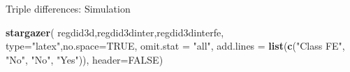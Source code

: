 \documentclass[
  ignorenonframetext,
]{beamer}
\newenvironment{Shaded}{\begin{snugshade}}{\end{snugshade}}
\newcommand{\DataTypeTok}[1]{\textcolor[rgb]{0.13,0.29,0.53}{#1}}
\newcommand{\KeywordTok}[1]{\textcolor[rgb]{0.13,0.29,0.53}{\textbf{#1}}}
\newcommand{\NormalTok}[1]{#1}
\newcommand{\OtherTok}[1]{\textcolor[rgb]{0.56,0.35,0.01}{#1}}
\newcommand{\StringTok}[1]{\textcolor[rgb]{0.31,0.60,0.02}{#1}}
\begin{document}
\begin{frame}[fragile]{Triple differences: Simulation}
\protect\hypertarget{triple-differences-simulation-3}{}
\tiny

\begin{Shaded}
\begin{Highlighting}[]
\KeywordTok{stargazer}\NormalTok{( regdid3d,regdid3dinter,regdid3dinterfe,}
           \DataTypeTok{type=}\StringTok{"latex"}\NormalTok{,}\DataTypeTok{no.space=}\OtherTok{TRUE}\NormalTok{,  }\DataTypeTok{omit.stat =} \StringTok{"all"}\NormalTok{,}
           \DataTypeTok{add.lines =} \KeywordTok{list}\NormalTok{(}\KeywordTok{c}\NormalTok{(}\StringTok{"Class FE"}\NormalTok{, }\StringTok{"No"}\NormalTok{, }\StringTok{"No"}\NormalTok{, }\StringTok{"Yes"}\NormalTok{)),}
           \DataTypeTok{header=}\OtherTok{FALSE}\NormalTok{)}
\end{Highlighting}
\end{Shaded}


\end{frame}
\end{document}
